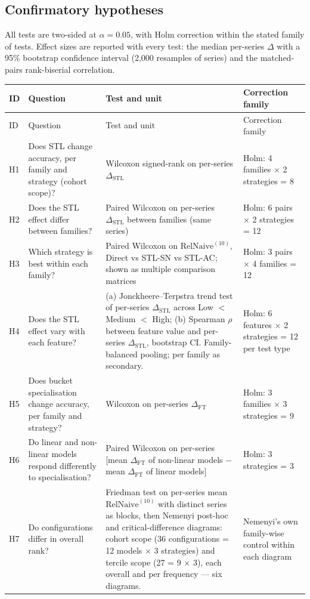 \documentclass[11pt,a4paper]{article}
\newcommand{\RN}{\mathrm{RelNaive}^{(10)}}
\newcommand{\dstl}{\Delta_{\mathrm{STL}}}
\newcommand{\dft}{\Delta_{\mathrm{FT}}}
\begin{document}
\subsection{Confirmatory hypotheses}

All tests are two-sided at $\alpha = 0.05$, with Holm correction within the stated family of tests.
Effect sizes are reported with every test: the median per-series $\Delta$ with a 95\% bootstrap
confidence interval (2,000 resamples of series) and the matched-pairs rank-biserial correlation.

{\small
\begin{longtable}{@{}p{0.6cm} p{5.1cm} p{5.1cm} p{4.0cm}@{}}
\toprule
ID & Question & Test and unit & Correction family \\
\midrule
\endfirsthead
\toprule
ID & Question & Test and unit & Correction family \\
\midrule
\endhead
\bottomrule
\endfoot
H1 & Does STL change accuracy, per family and strategy (cohort scope)? & Wilcoxon signed-rank on per-series $\dstl$ & Holm: 4 families $\times$ 2 strategies = 8 \\
H2 & Does the STL effect differ between families? & Paired Wilcoxon on per-series $\dstl$ between families (same series) & Holm: 6 pairs $\times$ 2 strategies = 12 \\
H3 & Which strategy is best within each family? & Paired Wilcoxon on $\RN$, Direct vs STL-SN vs STL-AC; shown as multiple comparison matrices & Holm: 3 pairs $\times$ 4 families = 12 \\
H4 & Does the STL effect vary with each feature? & (a) Jonckheere--Terpstra trend test of per-series $\dstl$ across Low $<$ Medium $<$ High; (b) Spearman $\rho$ between feature value and per-series $\dstl$, bootstrap CI. Family-balanced pooling; per family as secondary. & Holm: 6 features $\times$ 2 strategies = 12 per test type \\
H5 & Does bucket specialisation change accuracy, per family and strategy? & Wilcoxon on per-series $\dft$ & Holm: 3 families $\times$ 3 strategies = 9 \\
H6 & Do linear and non-linear models respond differently to specialisation? & Paired Wilcoxon on per-series [mean $\dft$ of non-linear models $-$ mean $\dft$ of linear models] & Holm: 3 strategies = 3 \\
H7 & Do configurations differ in overall rank? & Friedman test on per-series mean $\RN$ with distinct series as blocks, then Nemenyi post-hoc and critical-difference diagrams: cohort scope (36 configurations = 12 models $\times$ 3 strategies) and tercile scope (27 = 9 $\times$ 3), each overall and per frequency --- six diagrams. & Nemenyi's own family-wise control within each diagram \\
\end{longtable}
}
\end{document}
